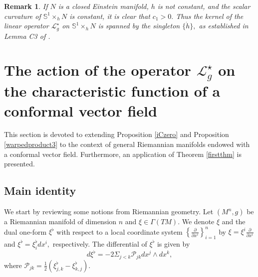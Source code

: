 \documentclass[10pt,leqno,oneside]{amsart}
\newtheorem{Rmk}{Remark}
\begin{document}
{    \begin{Rmk}
        If $N$ is a closed Einstein manifold, $h$ is not constant, and the scalar curvature of $\mathbb{S}^1\times_hN$ is constant, it is clear that $c_1>0.$ Thus the kernel of the linear operator $\mathcal{L}_g^{\star}$ on $\mathbb{S}^1\times_hN$ is spanned by the singleton $\{\dot{h}\},$ as established in {\rm Lemma C3} of {\rm\cite{Lafontaine1983}}.
    \end{Rmk}




\section{The action of the operator $\mathcal{L}_g^{\star}$ on the characteristic function of a conformal vector field}
    This section is devoted to extending Proposition \ref{iCzero} and Proposition \ref{warpedproduct3} to the context of general Riemannian manifolds endowed with a conformal vector field. Furthermore, an application of Theorem \ref{firstthm} is presented.
  \subsection{Main identity}
    We start by reviewing some notions from Riemannian geometry. Let $(M^n ,g)$ be a Riemannian manifold of dimension $n$ and $\xi\in\Gamma(TM).$ We denote $\xi$ and the dual one-form $\xi^{\flat}$ with respect to a local coordinate system $\left\{\frac{\partial}{\partial x^i}\right\}_{i=1}^n$ by $\xi=\xi^i\frac{\partial}{\partial x^i}$ and $\xi^{\flat}=\xi^{\flat}_{i}dx^i,$ respectively. The differential of $\xi^{\flat}$ is given by
         \[d\xi^{\flat}=-2\Sigma_{j<k}\mathcal{P}_{jk}dx^j\wedge dx^k,\]
         where $\mathcal{P}_{jk}=\frac{1}{2}(\xi^{\flat}_{j,k}-\xi^{\flat}_{k,j}).$ %

}
\end{document}
